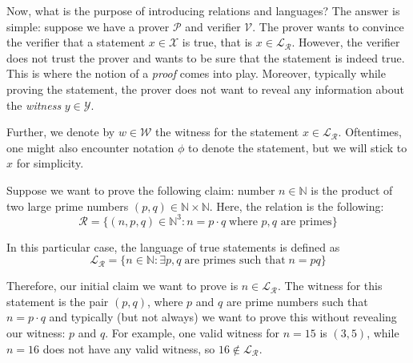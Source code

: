 \documentclass[../lecture-notes.tex]{subfiles}
\begin{document}
Now, what is the purpose of introducing relations and languages? The answer is simple: suppose we have a prover $\mathcal{P}$ and verifier $\mathcal{V}$. The prover wants to convince the verifier that a statement $x \in \mathcal{X}$ is true, that is $x \in \mathcal{L}_{\mathcal{R}}$. However, the verifier does not trust the prover and wants to be sure that the statement is indeed true. This is where the notion of a \emph{proof} comes into play. Moreover, typically while proving the statement, the prover does not want to reveal any information about the \emph{witness} $y \in \mathcal{Y}$. 

Further, we denote by $w \in \mathcal{W}$ the witness for the statement $x \in \mathcal{L}_{\mathcal{R}}$. Oftentimes, one might also encounter notation $\phi$ to denote the statement, but we will stick to $x$ for simplicity.

\begin{example}
    Suppose we want to prove the following claim: number $n \in \mathbb{N}$ is the product of two large prime numbers $(p,q) \in \mathbb{N} \times \mathbb{N}$. Here, the relation is the following:
    \begin{equation*}
        \mathcal{R} = \{ (n, p, q) \in \mathbb{N}^3: n = p \cdot q \; \text{where $p,q$ are primes} \}
    \end{equation*}

    In this particular case, the language of true statements is defined as 
    \begin{equation*}
        \mathcal{L}_{\mathcal{R}} = \{n \in \mathbb{N}: \exists p,q \; \text{are primes such that}\; n = pq\}
    \end{equation*}
    
    Therefore, our initial claim we want to prove is $n \in \mathcal{L}_{\mathcal{R}}$. The witness for this statement is the pair $(p,q)$, where $p$ and $q$ are prime numbers such that $n = p \cdot q$ and typically (but not always) we want to prove this without revealing our witness: $p$ and $q$. For example, one valid witness for $n = 15$ is $(3,5)$, while $n=16$ does not have any valid witness, so $16 \not\in \mathcal{L}_{\mathcal{R}}$.
\end{example}
\end{document}
